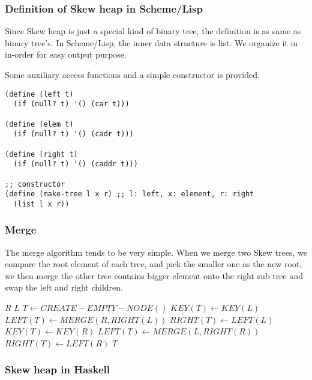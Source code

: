 \documentclass{article}
\begin{document}
\subsubsection*{Definition of Skew heap in Scheme/Lisp}
\label{skew-heap-def-lisp}

Since Skew heap is just a special kind of binary tree, the definition is
as same as binary tree's. In Scheme/Lisp, the inner data structure is
list. We organize it in in-order for easy output purpose.

Some auxiliary access functions and a simple constructor is provided.

\lstset{language = lisp}
\begin{lstlisting}
(define (left t)
  (if (null? t) '() (car t)))

(define (elem t)
  (if (null? t) '() (cadr t)))

(define (right t)
  (if (null? t) '() (caddr t)))

;; constructor
(define (make-tree l x r) ;; l: left, x: element, r: right
  (list l x r))
\end{lstlisting}

\subsubsection{Merge}

The merge algorithm tends to be very simple. When we merge two Skew
trees, we compare the root element of each tree, and pick the smaller
one as the new root, we then merge the other tree contains bigger
element onto the right sub tree and swap the left and right children.

\begin{algorithmic}[1]
    \State \Return $R$
    \State \Return $L$
  \Else
    \State $T \gets CREATE-EMPTY-NODE()$
      \State $KEY(T) \gets KEY(L)$
      \State $LEFT(T) \gets MERGE(R, RIGHT(L))$
      \State $RIGHT(T) \gets LEFT(L)$
    \Else
      \State $KEY(T) \gets KEY(R)$
      \State $LEFT(T) \gets MERGE(L, RIGHT(R))$
      \State $RIGHT(T) \gets LEFT(R)$
    \EndIf
    \State \Return $T$
  \EndIf
\EndFunction
\end{algorithmic}

\subsubsection*{Skew heap in Haskell}
\end{document}
